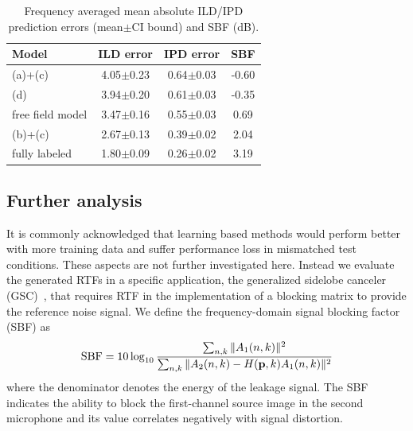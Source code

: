 \documentclass{article}
\begin{document}
\begin{table}[tb]
\caption{Frequency averaged mean absolute ILD/IPD prediction errors (mean$\pm$CI bound) and SBF (dB).}
\label{table:1}
\begin{center}
\begin{tabular}{|l||c|c||c|}
  \hline
   Model               & ILD error & IPD error & SBF \\ \hline
   (a)+(c)    & 4.05$\pm$0.23 & 0.64$\pm$0.03  &  -0.60\\ \hline
   (d)        & 3.94$\pm$0.20 & 0.61$\pm$0.03   &  -0.35\\ \hline
   free field model & 3.47$\pm$0.16 & 0.55$\pm$0.03 & 0.69\\ \hline
   (b)+(c)    & 2.67$\pm$0.13 & 0.39$\pm$0.02    &  2.04   \\ \hline
   fully labeled & 1.80$\pm$0.09 & 0.26$\pm$0.02 &  3.19 \\ \hline
\end{tabular}
\end{center}
\end{table}



\subsection{Further analysis}
\label{subsec:further}
It is commonly acknowledged that learning based methods would perform better with more training data and suffer performance loss in mismatched test conditions. These aspects are not further investigated here. Instead we evaluate the generated RTFs in a specific application, the generalized sidelobe canceler (GSC)~\cite{gannot2001signal}, that requires RTF in the implementation of a blocking matrix to provide the reference noise signal. We define the frequency-domain signal blocking factor (SBF) as
\begin{equation}\label{eq:sbf}
  \text{SBF}=10\log_{10}\frac{\sum_{n,k} \|A_1(n,k)\|^2}{\sum_{n,k} \|A_2(n,k)-H({\bf p},k)A_1(n,k)\|^2}
\end{equation}
where the denominator denotes the energy of the leakage signal. The SBF indicates the ability to block the first-channel source image in the second microphone and its value correlates negatively with signal distortion.
\end{document}
